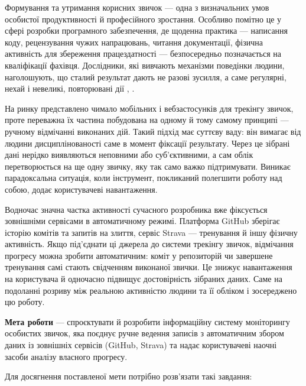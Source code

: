 
Формування та утримання корисних звичок — одна з визначальних умов особистої продуктивності й професійного зростання. Особливо помітно це у сфері розробки програмного забезпечення, де щоденна практика — написання коду, рецензування чужих напрацювань, читання документації, фізична активність для збереження працездатності — безпосередньо позначається на кваліфікації фахівця. Дослідники, які вивчають механізми поведінки людини, наголошують, що сталий результат дають не разові зусилля, а саме регулярні, нехай і невеликі, повторювані дії , .

На ринку представлено чимало мобільних і вебзастосунків для трекінгу звичок, проте переважна їх частина побудована на одному й тому самому принципі — ручному відмічанні виконаних дій. Такий підхід має суттєву ваду: він вимагає від людини дисциплінованості саме в момент фіксації результату. Через це зібрані дані нерідко виявляються неповними або суб'єктивними, а сам облік перетворюється на ще одну звичку, яку так само важко підтримувати. Виникає парадоксальна ситуація, коли інструмент, покликаний полегшити роботу над собою, додає користувачеві навантаження.

Водночас значна частка активності сучасного розробника вже фіксується зовнішніми сервісами в автоматичному режимі. Платформа GitHub зберігає історію комітів та запитів на злиття, сервіс Strava — тренування й іншу фізичну активність. Якщо під'єднати ці джерела до системи трекінгу звичок, відмічання прогресу можна зробити автоматичним: коміт у репозиторій чи завершене тренування самі стають свідченням виконаної звички. Це знижує навантаження на користувача й одночасно підвищує достовірність зібраних даних. Саме на подоланні розриву між реальною активністю людини та її обліком і зосереджено цю роботу.

\textbf{Мета роботи} — спроєктувати й розробити інформаційну систему моніторингу особистих звичок, яка поєднує ручне ведення записів з автоматичним збором даних із зовнішніх сервісів (GitHub, Strava) та надає користувачеві наочні засоби аналізу власного прогресу.

Для досягнення поставленої мети потрібно розв'язати такі завдання:

